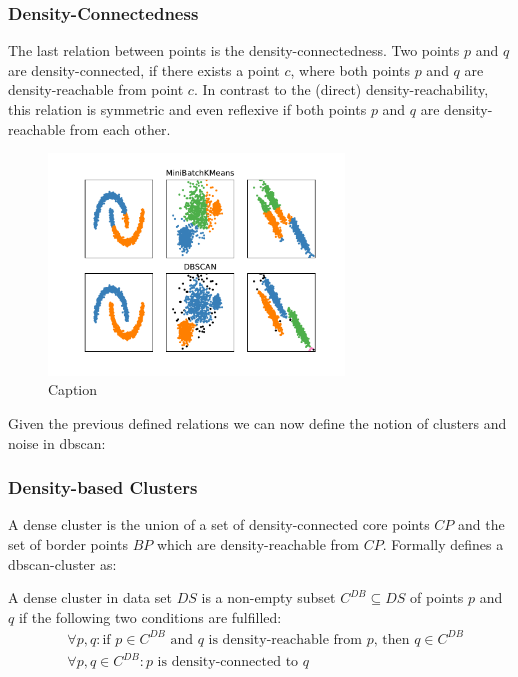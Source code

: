 \subsubsection*{Density-Connectedness}
The last relation between points is the density-connectedness. Two points $p$ and $q$ are density-connected, if there exists a point $c$, where both points $p$ and $q$ are density-reachable from point $c$. In contrast to the (direct) density-reachability, this relation is symmetric and even reflexive if both points $p$ and $q$ are density-reachable from each other. 
\begin{figure}
    \centering
    \includegraphics[width=0.7\textwidth]{figures/KMeansVSDBSCAN.pdf}
    \caption{Caption}
    \label{fig:kmeansdbscan}
\end{figure}

\vspace{5mm}

Given the previous defined relations we can now define the notion of clusters and noise in \gls{dbscan}:

\subsubsection*{Density-based Clusters}
A dense cluster is the union of a set of density-connected core points $CP$ and the set of border points $BP$ which are density-reachable from $CP$.
Formally \citeauthor{DBSCANEKSX96} defines a \gls{dbscan}-cluster as:

A dense cluster in data set $DS$ is a non-empty subset $C^{DB} \subseteq DS$ of points $p$ and $q$ if the following two conditions are fulfilled:
\begin{align}
    &\forall p, q: \text{if } p \in C^{DB} \text{ and } q \text{ is density-reachable from } p \text{, then } q \in C^{DB} \\
    &\forall p, q \in C^{DB}: p \text{ is density-connected to }q
\end{align}

